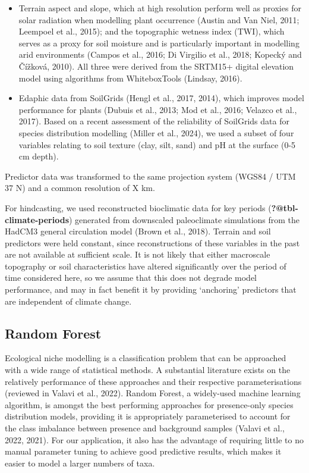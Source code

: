 \documentclass[
  number,
  review]{elsarticle}
\providecommand{\tightlist}{%
  \setlength{\itemsep}{0pt}\setlength{\parskip}{0pt}}\usepackage{longtable,booktabs,array}
\begin{document}
\begin{itemize}
\tightlist
\item
  Terrain aspect and slope, which at high resolution perform well as
  proxies for solar radiation when modelling plant occurrence (Austin
  and Van Niel, 2011; Leempoel et al., 2015); and the topographic
  wetness index (TWI), which serves as a proxy for soil moisture and is
  particularly important in modelling arid environments (Campos et al.,
  2016; Di Virgilio et al., 2018; Kopecký and Čížková, 2010). All three
  were derived from the SRTM15+ digital elevation model using algorithms
  from WhiteboxTools (Lindsay, 2016).
\end{itemize}

\begin{itemize}
\tightlist
\item
  Edaphic data from SoilGrids (Hengl et al., 2017, 2014), which improves
  model performance for plants (Dubuis et al., 2013; Mod et al., 2016;
  Velazco et al., 2017). Based on a recent assessment of the reliability
  of SoilGrids data for species distribution modelling (Miller et al.,
  2024), we used a subset of four variables relating to soil texture
  (clay, silt, sand) and pH at the surface (0-5 cm depth).
\end{itemize}

Predictor data was transformed to the same projection system (WGS84 /
UTM 37 N) and a common resolution of X km.

For hindcasting, we used reconstructed bioclimatic data for key periods
(\textbf{?@tbl-climate-periods}) generated from downscaled paleoclimate
simulations from the HadCM3 general circulation model (Brown et al.,
2018). Terrain and soil predictors were held constant, since
reconstructions of these variables in the past are not available at
sufficient scale. It is not likely that either macroscale topography or
soil characteristics have altered significantly over the period of time
considered here, so we assume that this does not degrade model
performance, and may in fact benefit it by providing `anchoring'
predictors that are independent of climate change.

\subsection{Random Forest}\label{random-forest}

Ecological niche modelling is a classification problem that can be
approached with a wide range of statistical methods. A substantial
literature exists on the relatively performance of these approaches and
their respective parameterisations (reviewed in Valavi et al., 2022).
Random Forest, a widely-used machine learning algorithm, is amongst the
best performing approaches for presence-only species distribution
models, providing it is appropriately parameterised to account for the
class imbalance between presence and background samples (Valavi et al.,
2022, 2021). For our application, it also has the advantage of requiring
little to no manual parameter tuning to achieve good predictive results,
which makes it easier to model a larger numbers of taxa.
\end{document}
